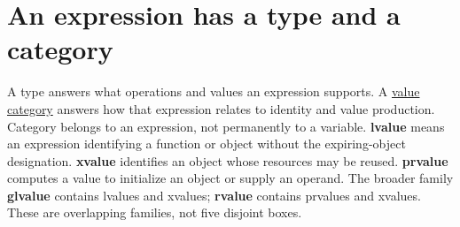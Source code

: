 \section{An expression has a type and a category}\label{01-foundations-i-ch003-an-expression-has-a-type-and-a-category}

\hypertarget{01-foundations-i-ch003-an-expression-has-a-type-and-a-category}{}

A type answers what operations and values an expression supports. A \hyperref[appendix-1121b30eaeb0]{value category} answers how that expression relates to identity and value production. Category belongs to an expression, not permanently to a variable. \textbf{lvalue} means an expression identifying a function or object without the expiring-object designation. \textbf{xvalue} identifies an object whose resources may be reused. \textbf{prvalue} computes a value to initialize an object or supply an operand. The broader family \textbf{glvalue} contains lvalues and xvalues; \textbf{rvalue} contains prvalues and xvalues. These are overlapping families, not five disjoint boxes.

